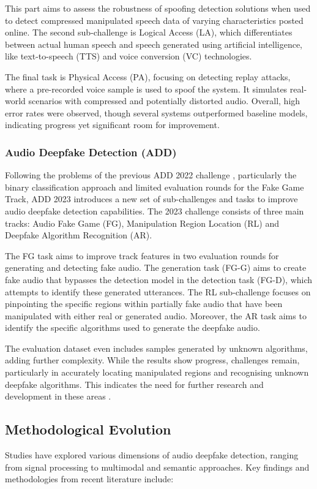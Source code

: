 \documentclass{Interspeech}
\begin{document}
This part aims to assess the robustness of spoofing detection solutions when
used to detect compressed manipulated speech data of varying characteristics
posted online. The second sub-challenge is Logical Access (LA), which
differentiates between actual human speech and speech generated using
artificial intelligence, like text-to-speech (TTS) and voice conversion (VC)
technologies.

The final task is Physical Access (PA), focusing on detecting replay attacks,
where a pre-recorded voice sample is used to spoof the system. It simulates
real-world scenarios with compressed and potentially distorted audio. Overall,
high error rates were observed, though several systems outperformed baseline
models, indicating progress yet significant room for improvement.

\subsubsection{Audio Deepfake Detection (ADD)} Following the problems of the previous ADD 2022 challenge \cite{yi2022add},
particularly the binary classification approach and limited evaluation rounds
for the Fake Game Track, ADD 2023 \cite{yi2023add} introduces a new set of
sub-challenges and tasks to improve audio deepfake detection capabilities. The
2023 challenge consists of three main tracks: Audio Fake Game (FG),
Manipulation Region Location (RL) and Deepfake Algorithm Recognition (AR).

The FG task aims to improve track features in two evaluation rounds for
generating and detecting fake audio. The generation task (FG-G) aims to create
fake audio that bypasses the detection model in the detection task (FG-D),
which attempts to identify these generated utterances. The RL sub-challenge
focuses on pinpointing the specific regions within partially fake audio that
have been manipulated with either real or generated audio. Moreover, the AR
task aims to identify the specific algorithms used to generate the deepfake
audio.

The evaluation dataset even includes samples generated by unknown algorithms,
adding further complexity. While the results show progress, challenges remain,
particularly in accurately locating manipulated regions and recognising unknown
deepfake algorithms. This indicates the need for further research and
development in these areas \cite{zeng2023deepfake}.

\subsection{Methodological Evolution}
Studies have explored various dimensions of audio deepfake detection, ranging
from signal processing to multimodal and semantic approaches. Key findings and
methodologies from recent literature include:
\end{document}

